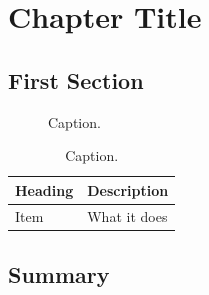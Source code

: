 \documentclass[../manual.tex]{subfiles}
\begin{document}
\chapter{Chapter Title}
\label{ch:slug}


\section{First Section}
\label{sec:slug_first}


\begin{figure}[H]
    \centering
    \caption{Caption.}
    \label{fig:slug_example}
\end{figure}

\begin{table}[H]
    \centering
    \begin{tabularx}{\textwidth}{|l|X|}
        \hline
        \rowcolor{gray!40} \textbf{Heading} & \textbf{Description} \\
        \hline
        Item & What it does \\
        \hline
    \end{tabularx}
    \caption{Caption.}
    \label{tab:slug_example}
\end{table}

\section{Summary}
\label{sec:slug_summary}

\end{document}
